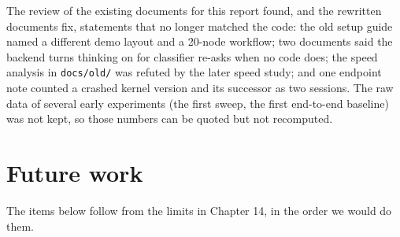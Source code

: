 \documentclass[11pt,a4paper]{report}
\begin{document}
The review of the existing documents for this report found, and the rewritten documents fix, statements that no longer matched the code: the old setup guide named a different demo layout and a 20-node workflow; two documents said the backend turns thinking on for classifier re-asks when no code does; the speed analysis in \texttt{docs/\allowbreak{}old/\allowbreak{}} was refuted by the later speed study; and one endpoint note counted a crashed kernel version and its successor as two sessions. The raw data of several early experiments (the first sweep, the first end-to-end baseline) was not kept, so those numbers can be quoted but not recomputed.

\chapter{Future work}

The items below follow from the limits in Chapter 14, in the order we would do them.
\end{document}
